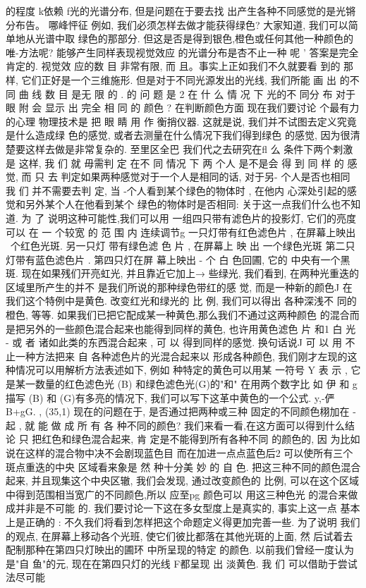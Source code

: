 \documentclass[11pt,oneside]{book}
\begin{document}
\begin{common-format}
的程度 k依赖 f光的光谱分布, 但是问题在于要去找 出产生各种不同感觉的是光锵分布告。
哪峰怦征
例如, 我们必须怎样去做才能获得绿色? 大家知道, 我们可以简单地从光谱中取
绿色的那部分. 但这是否是得到银色,橙色或任何其他一种颜色的唯-方法呢?
能够产生同样表现视觉效应 的光谱分布是杏不止一种 呢 ' 答案是完全肯定的. 视觉效
应的数 目 非常有限, 而 且。事实上正如我们不久就要看 到的 那样, 它们正好是一个三维施形.
但是对于不同光源发出的光线, 我们所能 画 出 的不 同 曲 线 数 目 是无 限 的 .
的 问 题 是 2 在 什 么 情 况 下 光的不 同分 布 对于 眼 附 会 显示 出 完全 相 同 的 颜色 ?
在判断颜色方面
现在我们要讨论
个最有力的心理 物理技术是 把 眼 睛 用 作 衡捎仪器. 这就是说,
我们并不试图去定义究竟是什么造成绿 色的感觉, 或者去测量在什么情况下我们得到绿色
的感觉, 因为很清楚要这样去做是非常复杂的.
至里区全巴
我们代之去研究在fl 么 条件下两个剌激是
这样, 我 们 就 毋需判 定 在不 同 情况 下 两 个人 是不是会 得 到 同 样 的 感觉, 而 只 去
判定如果两种感觉对于一个人是相同的话, 对于另- 个人是否也相同
我 们 并不需要去判
定, 当 -个人看到某个绿色的物体时 , 在他内 心深处引起的感觉和另外某个人在他看到某个
绿色的物体时是否相同: 关于这一点我们什么也不知道.
为 了 说明这种可能性,我们可以用 一组四只带有滤色片的投影灯, 它们的亮度可以 在 一
个较宽 的 范 围 内 连续调节g 一只灯带有红色滤色片 , 在屏幕上映出 ~个红色光斑. 另一只灯
带有绿色滤 色 片 , 在屏幕上 映 出 一个绿色光斑
第二只灯带有蓝色滤色片 . 第四只灯在屏
幕上映出 - 个 白 色回圃, 它的 中央有一个黑斑. 现在如果残们开亮虹光, 并且靠近它加上→
些绿光, 我们看到, 在两种光重迭的区域里所产生的并不 是我们所说的那种绿色带红的感
觉, 而是一种新的颜色J 在我们这个特例中是黄色. 改变红光和绿光的 比 例, 我们可以得出
各种深浅不 同的橙色, 等等. 如果我们已把它配成某一种黄色,那么我们不通过这两种颜色
的混合而是把另外的一些颜色混合起来也能得到同样的黄色, 也许用黄色滤色 片 和1 白 光 - 或
者 诸如此类的东西混合起来 , 可 以 得到同样的感觉. 换句话说J 可 以 用 不止一种方法把来 自
各种滤色片的光混合起来以 形成各种颜色,
我们刚才左现的这种情况可以用解析方法表述如下,
例如
种特定的黄色可以用某
一符号 Y 表 示 , 它是某一数量的红色滤色光 (B) 和绿色滤色光(G)的"和"
在用两个数字比
如 伊 和 g 描写 (B) 和 (G)有多亮的情况下, 我们可以写下这革中黄色的一个公式.
y,-俨B+gG.
,
(35,1)
现在的问题在于, 是否通过把两种或三种 固定的不同颜色栩加在 - 起 , 就 能 做 成 所 有 各
种不同的颜色? 我们来看一看,在这方面可以得到什么结论
只 把红色和绿色混合起来, 肯
定是不能得到所有各种不同 的颜色的, 因 为比如说在这样的混合物中决不会剧现蓝色目
而在加进一点点蓝色后2 可以使所有三个斑点重迭的中央 区域看来象是
然
种十分美 妙 的 自
色. 把这三种不同的颜色混合起来, 并且现集这个中央区辙, 我们会发现, 通过改变颜色的
比例, 可以在这个区域中得到范围相当宽广的不同颜色,所以 应至pg 颜色可以 用这三种色光
的混合来做成并非是不可能 的.
我们要讨论一下这在多女型度上是真实的, 事实上这一点
基本上是正确的 : 不久我们将看到怎样把这个命题定义得更加完善一些.
为了说明 我们的观点, 在屏幕上移动各个光班, 使它们彼比都落在其他光斑的上面, 然
后试着去配制那种在第四只灯映出的圃环 中所呈现的特定 的颜色. 以前我们曾经一度认为
是"自 鱼"的元, 现在在第四只灯的光线 F都呈现 出 淡黄色.
我 们 可以借助于尝试法尽可能


\end{common-format}
\end{document}

